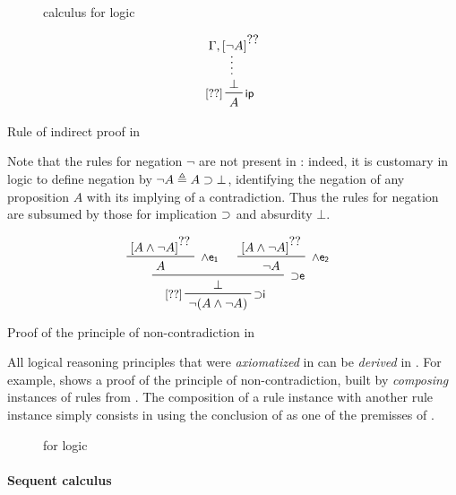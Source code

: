 \begin{figure*}
  
  \caption{ calculus  for  logic}
\end{figure*}

\begin{marginfigure}
  $$
  \prftree[r][l]{\rsf{ip}}{\small[\prfref<H1>]}
  {\summ
    {\Gamma, \prfboundedassumption<H1>{\neg A}}
    {\bot}}
  {A}    
  $$
  \caption{Rule of indirect proof in }
\end{marginfigure}

\begin{remark}
  Note that the rules for negation $\neg$ are not present in
  : indeed, it is customary in  logic to define
  negation by $\neg A \triangleq A \supset \bot$, identifying the negation of any
  proposition $A$ with its implying of a contradiction. Thus the rules for
  negation are subsumed by those for implication $\supset$ and absurdity $\bot$.
\end{remark}

\begin{marginfigure}
  $$
  \prftree[r][l]{\rsf{{\limp}i}}{\small[\prfref<H1>]}
    {\R[\rsf{{\limp}e}]
      {\R[\rsf{\land e_1}]
        {\prfboundedassumption<H1>{A \land \neg A}}
        {A}}
      {\R[\rsf{\land e_2}]
        {\prfboundedassumption<H1>{A \land \neg A}}
        {\neg A}}
      {\bot}}
    {\neg (A \land \neg A)}
  $$
  \caption{Proof of the principle of non-contradiction in }
\end{marginfigure}

All logical reasoning principles that were \emph{axiomatized} in  can be \emph{derived} in . For example,
 shows a proof of the principle of non-contradiction, built by
\emph{composing} instances of rules from . The composition of
a rule instance  with another rule instance  simply consists in
using the conclusion of  as one of the premisses of .

\begin{figure*}
  
  \caption{  for  logic}
\end{figure*}

\paragraph{Sequent calculus}

